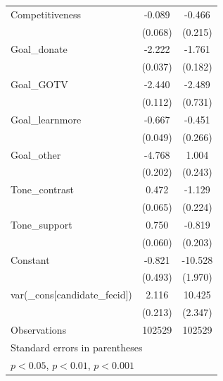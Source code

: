 \begin{tabular}{l*{2}{c}}
Competitiveness &      -0.089         &      -0.466\sym{*}  \\
                    &     (0.068)         &     (0.215)         \\
Goal\_donate             &      -2.222\sym{***}&      -1.761\sym{***}\\
                    &     (0.037)         &     (0.182)         \\
Goal\_GOTV                &      -2.440\sym{***}&      -2.489\sym{***}\\
                    &     (0.112)         &     (0.731)         \\
Goal\_learnmore           &      -0.667\sym{***}&      -0.451         \\
                    &     (0.049)         &     (0.266)         \\
Goal\_other               &      -4.768\sym{***}&       1.004\sym{***}\\
                    &     (0.202)         &     (0.243)         \\
Tone\_contrast            &       0.472\sym{***}&      -1.129\sym{***}\\
                    &     (0.065)         &     (0.224)         \\
Tone\_support             &       0.750\sym{***}&      -0.819\sym{***}\\
                    &     (0.060)         &     (0.203)         \\

Constant            &      -0.821         &     -10.528\sym{***}\\
                    &     (0.493)         &     (1.970)         \\
\midrule
var(\_cons[candidate\_fecid])&       2.116\sym{***}&      10.425\sym{***}\\
                    &     (0.213)         &     (2.347)         \\
\midrule
Observations        &      102529         &      102529         \\
\bottomrule
\multicolumn{3}{l}{\footnotesize Standard errors in parentheses}\\
\multicolumn{3}{l}{\footnotesize \sym{*} \(p<0.05\), \sym{**} \(p<0.01\), \sym{***} \(p<0.001\)}\\
\end{tabular}
